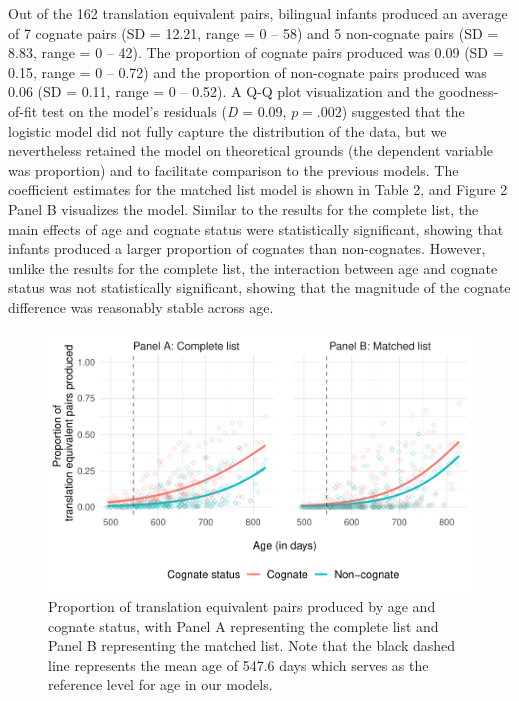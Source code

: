 \documentclass[
  ,man,floatsintext]{apa6}
\begin{document}
Out of the 162 translation equivalent pairs, bilingual infants produced an average of 7 cognate pairs (SD = 12.21, range = 0 -- 58) and 5 non-cognate pairs (SD = 8.83, range = 0 -- 42). The proportion of cognate pairs produced was 0.09 (SD = 0.15, range = 0 -- 0.72) and the proportion of non-cognate pairs produced was 0.06 (SD = 0.11, range = 0 -- 0.52). A Q-Q plot visualization and the goodness-of-fit test on the model's residuals (\emph{D} = 0.09, \(p = .002\)) suggested that the logistic model did not fully capture the distribution of the data, but we nevertheless retained the model on theoretical grounds (the dependent variable was proportion) and to facilitate comparison to the previous models. The coefficient estimates for the matched list model is shown in Table 2, and Figure 2 Panel B visualizes the model. Similar to the results for the complete list, the main effects of age and cognate status were statistically significant, showing that infants produced a larger proportion of cognates than non-cognates. However, unlike the results for the complete list, the interaction between age and cognate status was not statistically significant, showing that the magnitude of the cognate difference was reasonably stable across age.

\begin{figure}

{\centering \includegraphics[width=1.2\linewidth]{CogVocab_paper_files/figure-latex/Fig2-1} 

}

\caption{Proportion of translation equivalent pairs produced by age and cognate status, with Panel A representing the complete list and Panel B representing the matched list. Note that the black dashed line represents the mean age of 547.6 days which serves as the reference level for age in our models.}\label{fig:Fig2}
\end{figure}
\end{document}
